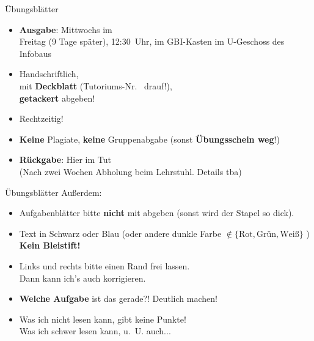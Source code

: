 \begin{frame}{Übungsblätter}
	\begin{itemize}
		\item \textbf{Ausgabe}: Mittwochs im \ILIAS \\
			   Freitag (9 Tage später), 12:30~Uhr, im GBI-Kasten im U-Geschoss des Infobaus
		\pause
		\item Handschriftlich, \\ 
		mit \textbf{Deckblatt} (Tutoriums-Nr. \mytutnumber\  drauf!), \\ 
		\textbf{getackert} abgeben!
		\item Rechtzeitig! 
		\item \textbf{Keine} Plagiate, \textbf{keine} Gruppenabgabe (sonst \textbf{Übungsschein weg}!) 
		\pause
		\item \textbf{Rückgabe}: Hier im Tut \\ (Nach zwei Wochen Abholung beim Lehrstuhl. Details tba)
	\end{itemize}
\end{frame}

\begin{frame}{Übungsblätter}
	Außerdem:
	\begin{itemize}
		\item Aufgabenblätter bitte \textbf{nicht} mit abgeben (sonst wird der Stapel so dick).
		\item Text in Schwarz oder Blau (oder andere dunkle Farbe $\notin \{\text{Rot}, \text{Grün}, \text{Weiß}\}$ ) \\
			  \textbf{Kein Bleistift!}
		\item Links und rechts bitte einen Rand frei lassen. \\
			  Dann kann ich's auch korrigieren. \smiley
		\item \textbf{Welche Aufgabe} ist das gerade?! \impl Deutlich machen!
		\item Was ich nicht lesen kann, gibt keine Punkte! \\
			  \small Was ich schwer lesen kann, u.~U. auch... 
	\end{itemize}
\end{frame}



